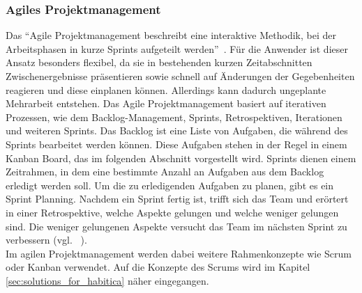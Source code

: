 \documentclass[sigconf, nonacm]{acmart}
\begin{document}
\subsubsection{Agiles Projektmanagement}
Das \enquote{Agile Projektmanagement beschreibt eine interaktive Methodik, bei der Arbeitsphasen in kurze Sprints aufgeteilt werden}~\cite{asana_kanban_nodate}. Für die Anwender ist dieser Ansatz besonders flexibel, da sie in bestehenden kurzen Zeitabschnitten Zwischenergebnisse präsentieren sowie schnell auf Änderungen der Gegebenheiten reagieren und diese einplanen können. Allerdings kann dadurch ungeplante Mehrarbeit entstehen.
Das Agile Projektmanagement basiert auf iterativen Prozessen, wie dem Backlog-Management, Sprints, Retrospektiven, Iterationen und weiteren Sprints.
Das Backlog ist eine Liste von Aufgaben, die während des Sprints bearbeitet werden können. Diese Aufgaben stehen in der Regel in einem Kanban Board, das im folgenden Abschnitt vorgestellt wird. Sprints dienen einem Zeitrahmen, in dem eine bestimmte Anzahl an Aufgaben aus dem Backlog erledigt werden soll. Um die zu erledigenden Aufgaben zu planen, gibt es ein Sprint Planning. Nachdem ein Sprint fertig ist, trifft sich das Team und erörtert in einer Retrospektive, welche Aspekte gelungen und welche weniger gelungen sind. Die weniger gelungenen Aspekte versucht das Team im nächsten Sprint zu verbessern (vgl. ~\cite{asana_kanban_nodate}).
\\
Im agilen Projektmanagement werden dabei weitere Rahmenkonzepte wie Scrum oder Kanban verwendet. Auf die Konzepte des Scrums wird im Kapitel \ref{sec:solutions_for_habitica} näher eingegangen.
\end{document}
